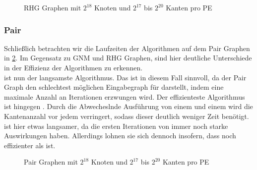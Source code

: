 \begin{figure}[H]
    \centering
    
    
    
    
    \caption{RHG Graphen mit $2^{18}$ Knoten und $2^{17}$ bis $2^{20}$ Kanten pro PE}
    \label{RHG-graphs-Img}
\end{figure}





\subsubsection{Pair}
Schließlich betrachten wir die Laufzeiten der Algorithmen auf dem Pair Graphen in \cref{Pair-graphs-Img}. Im Gegensatz zu GNM und RHG Graphen, sind hier deutliche Unterschiede in der Effizienz der Algorithmen zu erkennen.\\
\boruvkaAllreduce ist nun der langsamste Algorithmus. Das ist in diesem Fall sinnvoll, da der Pair Graph den schlechtest möglichen Eingabegraph für \boruvkasAlgorithmus darstellt, indem eine maximale Anzahl an Iterationen erzwungen wird.
Der effizienteste Algorithmus ist hingegen \boruvkaMixedMergeNoSpace. Durch die Abwecheslnde Ausführung von einem \boruvkaStep und einem \mergeStep wird die Kantenanzahl vor jedem \boruvkaStep verringert, sodass dieser deutlich weniger Zeit benötigt.\\
\boruvkaThenMerge ist hier etwas langsamer, da die ersten Iterationen von \boruvkasAlgorithmus immer noch starke Auswirkungen haben. Allerdings lohnen sie sich dennoch insofern, dass \boruvkaThenMerge noch effizienter als \mergeMST ist.

\begin{figure}[H]
    \centering
    
    
    
    
    \caption{Pair Graphen mit $2^{18}$ Knoten und $2^{17}$ bis $2^{20}$ Kanten pro PE}
    \label{Pair-graphs-Img}
\end{figure}


